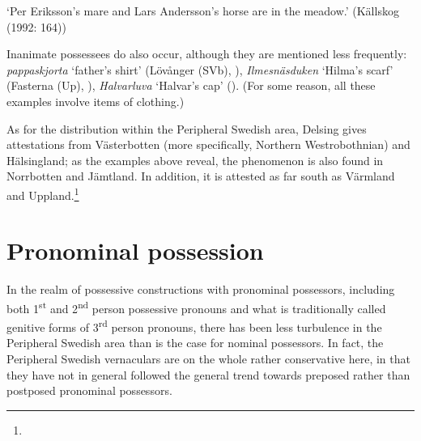 \begin{styleTranslation}
‘Per Eriksson’s mare and Lars Andersson’s horse are in the meadow.’ (Källskog (1992: 164))

\end{styleTranslation}

\begin{styleBodyTextFirst}
Inanimate possessees do also occur, although they are mentioned less frequently: \textit{pappaskjorta} ‘father’s shirt’ (Lövånger (SVb), \citet{Holm1942}), \textit{Ilmesnäsduken} ‘Hilma’s scarf’ (Fasterna (Up), \citet[134]{Tiselius1902}), \textit{Halvarluva} ‘Halvar’s cap’ (\citet{Oscarsson2007}). (For some reason, all these examples involve items of clothing.)

\end{styleBodyTextFirst}

\begin{styleBodytextC}
As for the distribution within the Peripheral Swedish area, Delsing gives attestations from Västerbotten (more specifically, Northern Westrobothnian) and Hälsingland; as the examples above reveal, the phenomenon is also found in Norrbotten and Jämtland. In addition, it is attested as far south as Värmland and Uppland.\footnote{}

\end{styleBodytextC}

\section{\rmfamily\bfseries Pronominal possession}

\begin{styleBodyTextFirst}
In the realm of possessive constructions with pronominal possessors, including both 1\textsuperscript{st} and 2\textsuperscript{nd} person possessive pronouns and what is traditionally called genitive forms of 3\textsuperscript{rd} person pronouns, there has been less turbulence in the Peripheral Swedish area than is the case for nominal possessors. In fact, the Peripheral Swedish vernaculars are on the whole rather conservative here, in that they have not in general followed the general trend towards preposed rather than postposed pronominal possessors. 

\end{styleBodyTextFirst}

